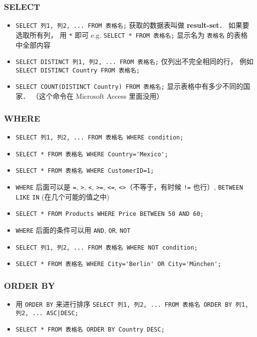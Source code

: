 \subsubsection{SELECT}
\begin{itemize}
\item \verb`SELECT 列1, 列2, ... FROM 表格名;` 获取的数据表叫做 \textbf{result-set}． 如果要选取所有列， 用 \verb`*` 即可 e.g. \verb`SELECT * FROM 表格名;` 显示名为 \verb|表格名| 的表格中全部内容
\item \verb`SELECT DISTINCT 列1, 列2, ... FROM 表格名;` 仅列出不完全相同的行， 例如 \verb`SELECT DISTINCT Country FROM 表格名;`
\item \verb`SELECT COUNT(DISTINCT Country) FROM 表格名;` 显示表格中有多少不同的国家． （这个命令在 Microsoft Access 里面没用）
\end{itemize}

\subsubsection{WHERE}
\begin{itemize}
\item \verb`SELECT 列1, 列2, ... FROM 表格名 WHERE condition;`
\item \verb`SELECT * FROM 表格名 WHERE Country='Mexico';`
\item \verb`SELECT * FROM 表格名 WHERE CustomerID=1;`
\item \verb`WHERE` 后面可以是 \verb`=`, \verb`>`, \verb`<`, \verb`>=`, \verb`<=`, \verb`<>`（不等于，有时候 \verb`!=` 也行）, \verb`BETWEEN` \verb`LIKE` \verb`IN` (在几个可能的值之中)
\item \verb`SELECT * FROM Products WHERE Price BETWEEN 50 AND 60;`
\item \verb`WHERE` 后面的条件可以用 \verb`AND`, \verb`OR`, \verb`NOT`
\item \verb`SELECT 列1, 列2, ... FROM 表格名 WHERE NOT condition;`
\item \verb`SELECT * FROM 表格名 WHERE City='Berlin' OR City='München';`
\end{itemize}

\subsubsection{ORDER BY}
\begin{itemize}
\item 用 \verb`ORDER BY` 来进行排序 \verb`SELECT 列1, 列2, ... FROM 表格名 ORDER BY 列1, 列2, ... ASC|DESC;`
\item \verb`SELECT * FROM 表格名 ORDER BY Country DESC;`
\end{itemize}

